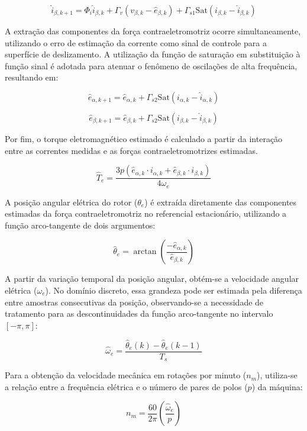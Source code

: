 \begin{equation}
    \hat{i}_{\beta,k+1} = \Phi_{i} \hat{i}_{\beta,k} + \Gamma_{v} (v_{\beta,k} - \hat{e}_{\beta,k}) + \Gamma_{s1} \text{Sat}(i_{\beta,k} - \hat{i}_{\beta,k})
\end{equation}

A extração das componentes da força contraeletromotriz ocorre simultaneamente, utilizando o erro de estimação da corrente como sinal de controle para a superfície de deslizamento. A utilização da função de saturação em substituição à função sinal é adotada para atenuar o fenômeno de oscilações de alta frequência, resultando em:

\begin{equation}
    \hat{e}_{\alpha,k+1} = \hat{e}_{\alpha,k} + \Gamma_{s2} \text{Sat}(i_{\alpha,k} - \hat{i}_{\alpha,k})
\end{equation}

\begin{equation}
    \hat{e}_{\beta,k+1} =  \hat{e}_{\beta,k} + \Gamma_{s2} \text{Sat}(i_{\beta,k} - \hat{i}_{\beta,k})
\end{equation}

Por fim, o torque eletromagnético estimado é calculado a partir da interação entre as correntes medidas e as forças contraeletromotrizes estimadas.

\begin{equation}
    \hat{T}_e = \frac{3 p (\hat{e}_{\alpha,k} \cdot i_{\alpha,k} + \hat{e}_{\beta,k} \cdot i_{\beta,k})}{4 \omega_{e}}
\end{equation}

A posição angular elétrica do rotor ($\theta_e$) é extraída diretamente das componentes estimadas da força contraeletromotriz no referencial estacionário, utilizando a função arco-tangente de dois argumentos:

\begin{equation}
    \hat{\theta}_e = \arctan \left( \frac{-\hat{e}_{\alpha,k}}{\hat{e}_{\beta,k}} \right)
\end{equation}

A partir da variação temporal da posição angular, obtém-se a velocidade angular elétrica ($\omega_e$). No domínio discreto, essa grandeza pode ser estimada pela diferença entre amostras consecutivas da posição, observando-se a necessidade de tratamento para as descontinuidades da função arco-tangente no intervalo $[-\pi, \pi]$:

\begin{equation}
    \hat{\omega}_e = \frac{\hat{\theta}_e(k) - \hat{\theta}_e(k-1)}{T_s}
\end{equation}

Para a obtenção da velocidade mecânica em rotações por minuto ($n_m$), utiliza-se a relação entre a frequência elétrica e o número de pares de polos ($p$) da máquina:

\begin{equation}
    n_m = \frac{60}{2\pi} \left( \frac{\hat{\omega}_e}{p} \right)
\end{equation}
